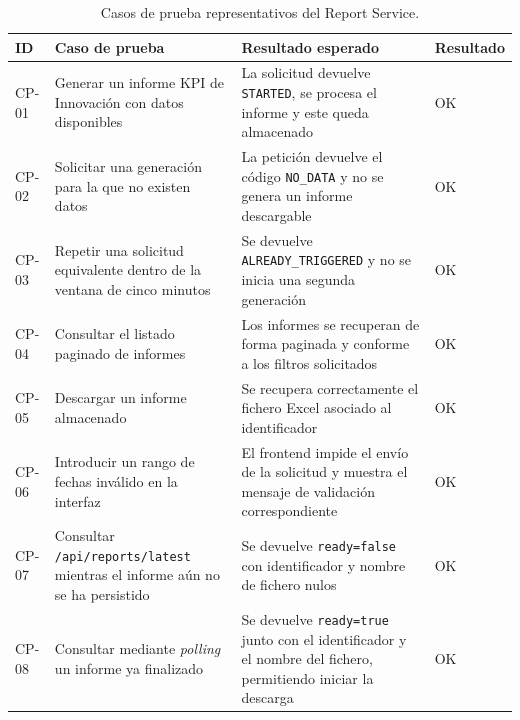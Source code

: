 \documentclass[11pt,a4paper,titlepage,oneside]{report}
\newcommand{\tfgtablestyle}{%
  \small
  \setlength{\tabcolsep}{4pt}%
  \renewcommand{\arraystretch}{1.15}%
  \rowcolors{2}{udcgray!08}{white}%
}
\begin{document}
\begin{table}[H]
  \centering
  \tfgtablestyle
  \caption{Casos de prueba representativos del Report Service.}
  \label{tab:casos-prueba}

  \begin{tabularx}{0.97\textwidth}
    {@{}p{}X X p{}@{}}

    \toprule
    \rowcolor{udcpink!20}

    \textbf{ID} &
    \textbf{Caso de prueba} &
    \textbf{Resultado esperado} &
    \textbf{Resultado} \\

    \midrule

    CP-01 &
    Generar un informe KPI de Innovación con datos disponibles &
    La solicitud devuelve \texttt{STARTED}, se procesa el informe y este
    queda almacenado &
    OK \\

    CP-02 &
    Solicitar una generación para la que no existen datos &
    La petición devuelve el código \texttt{NO\_DATA} y no se genera un
    informe descargable &
    OK \\

    CP-03 &
    Repetir una solicitud equivalente dentro de la ventana de cinco minutos &
    Se devuelve \texttt{ALREADY\_TRIGGERED} y no se inicia una segunda
    generación &
    OK \\

    CP-04 &
    Consultar el listado paginado de informes &
    Los informes se recuperan de forma paginada y conforme a los filtros
    solicitados &
    OK \\

    CP-05 &
    Descargar un informe almacenado &
    Se recupera correctamente el fichero Excel asociado al identificador &
    OK \\

    CP-06 &
    Introducir un rango de fechas inválido en la interfaz &
    El frontend impide el envío de la solicitud y muestra el mensaje de
    validación correspondiente &
    OK \\

    CP-07 &
    Consultar \texttt{/api/reports/latest} mientras el informe aún no se ha
    persistido &
    Se devuelve \texttt{ready=false} con identificador y nombre de fichero
    nulos &
    OK \\

    CP-08 &
    Consultar mediante \textit{polling} un informe ya finalizado &
    Se devuelve \texttt{ready=true} junto con el identificador y el nombre
    del fichero, permitiendo iniciar la descarga &
    OK \\

    \bottomrule
  \end{tabularx}

\end{table}
\end{document}
